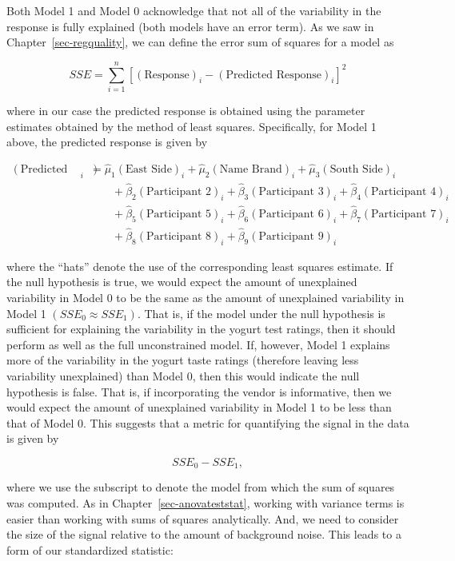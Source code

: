\documentclass[
  letterpaper,
  DIV=11,
  numbers=noendperiod]{scrreprt}
\theoremstyle{definition}
\theoremstyle{definition}
\theoremstyle{plain}
\theoremstyle{remark}
\begin{document}
Both Model 1 and Model 0 acknowledge that not all of the variability in
the response is fully explained (both models have an error term). As we
saw in Chapter~\ref{sec-regquality}, we can define the error sum of
squares for a model as

\[SSE = \sum_{i=1}^{n} \left[(\text{Response})_i - (\text{Predicted Response})_i\right]^2\]

where in our case the predicted response is obtained using the parameter
estimates obtained by the method of least squares. Specifically, for
Model 1 above, the predicted response is given by

\[
\begin{aligned}
  (\text{Predicted Response})_i &= \widehat{\mu}_1 (\text{East Side})_i + \widehat{\mu}_2 (\text{Name Brand})_i + \widehat{\mu}_3 (\text{South Side})_i \\
    &\qquad + \widehat{\beta}_2 (\text{Participant 2})_i + \widehat{\beta}_3 (\text{Participant 3})_i + \widehat{\beta}_4 (\text{Participant 4})_i \\
    &\qquad + \widehat{\beta}_5 (\text{Participant 5})_i + \widehat{\beta}_6 (\text{Participant 6})_i + \widehat{\beta}_7 (\text{Participant 7})_i \\
    &\qquad + \widehat{\beta}_8 (\text{Participant 8})_i + \widehat{\beta}_9 (\text{Participant 9})_i 
\end{aligned}
\]

where the ``hats'' denote the use of the corresponding least squares
estimate. If the null hypothesis is true, we would expect the amount of
unexplained variability in Model 0 to be the same as the amount of
unexplained variability in Model 1 \(\left(SSE_0 \approx SSE_1\right)\).
That is, if the model under the null hypothesis is sufficient for
explaining the variability in the yogurt test ratings, then it should
perform as well as the full unconstrained model. If, however, Model 1
explains more of the variability in the yogurt taste ratings (therefore
leaving less variability unexplained) than Model 0, then this would
indicate the null hypothesis is false. That is, if incorporating the
vendor is informative, then we would expect the amount of unexplained
variability in Model 1 to be less than that of Model 0. This suggests
that a metric for quantifying the signal in the data is given by

\[SSE_0 - SSE_1,\]

where we use the subscript to denote the model from which the sum of
squares was computed. As in Chapter~\ref{sec-anovateststat}, working
with variance terms is easier than working with sums of squares
analytically. And, we need to consider the size of the signal relative
to the amount of background noise. This leads to a form of our
standardized statistic:
\end{document}
